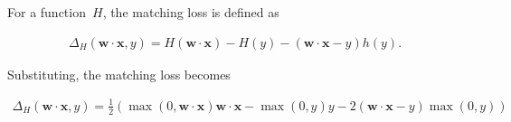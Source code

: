 \documentclass{report}
\newcommand{\w}{\mathbf{w}}
\newcommand{\xvec}{\mathbf{x}}
\newcommand{\wx}{\w\cdot\xvec}
\begin{document}
  For a function~$H$, the matching loss is defined as
  
  \begin{align}
    \Delta_{H}(\wx, y) = H(\wx) - H(y) - (\wx - y)h(y)\textrm{.}
  \end{align}

  Substituting, the matching loss becomes
  
  \begin{align}
    \boxed{\Delta_{H}(\wx, y) = \frac{1}{2}\left( \max(0,\wx)\wx - \max(0,y)y - 2(\wx -y)\max(0,y) \right)}
  \end{align}
\end{document}
